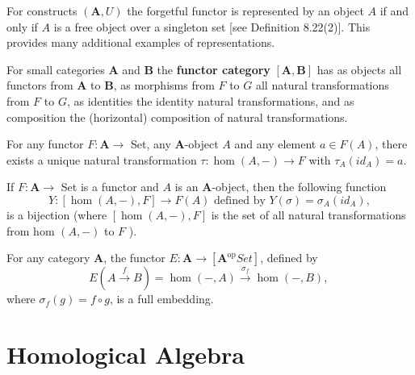 \begin{prop}
    For constructs $(\mathbf{A}, U)$ the forgetful functor is represented by an object $A$ if and only if $A$ is a free object over a singleton set [see Definition 8.22(2)]. This provides many additional examples of representations.
\end{prop}

For small categories $\mathbf{A}$ and $\mathbf{B}$ the \textbf{functor category} $[\mathbf{A}, \mathbf{B}]$ has as objects all functors from $\mathbf{A}$ to $\mathbf{B}$, as morphisms from $F$ to $G$ all natural transformations from $F$ to $G$, as identities the identity natural transformations, and as composition the (horizontal) composition of natural transformations.

\begin{theo}
    For any functor $F: \mathbf{A} \rightarrow$ Set, any $\mathbf{A}$-object $A$ and any element $a \in F(A)$, there exists a unique natural transformation $\tau: \operatorname{hom}(A,-) \rightarrow F$ with $\tau_A\left(i d_A\right)=a$.
\end{theo}

\begin{coro}
    If $F: \mathbf{A} \rightarrow$ Set is a functor and $A$ is an $\mathbf{A}$-object, then the following function
    $$
    Y:[\operatorname{hom}(A,-), F] \rightarrow F(A) \text { defined by } Y(\sigma)=\sigma_A\left(i d_A\right),
    $$
    is a bijection (where $[\operatorname{hom}(A,-), F]$ is the set of all natural transformations from hom $(A,-)$ to $F$ ).
    
\end{coro}

\begin{coro}
    For any category $\mathbf{A}$, the functor $E: \mathbf{A} \rightarrow\left[\mathbf{A}^{\mathrm{op}} Set \right]$, defined by
$$
E(A \xrightarrow{f} B)=\operatorname{hom}(-, A) \xrightarrow{\sigma_f} \operatorname{hom}(-, B) \text {, }
$$
where $\sigma_f(g)=f \circ g$, is a full embedding.
\end{coro}












\chapter{Homological Algebra}

